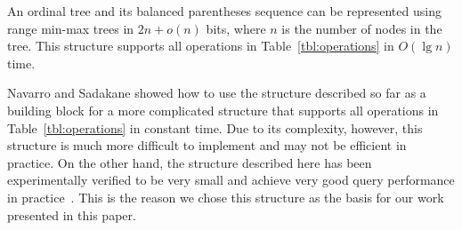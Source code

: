 \begin{lemma}\label{lem:lg}
  An ordinal tree and its balanced parentheses sequence can be represented using
  range min-max trees in $2n + o(n)$ bits, where $n$ is the number of nodes in
  the tree.
  This structure supports all operations in Table~\ref{tbl:operations} in
  $O(\lg n)$ time.
\end{lemma}

Navarro and Sadakane showed how to use the structure described so far as a
building block for a more complicated structure that supports all operations in
Table~\ref{tbl:operations} in constant time.
Due to its complexity, however, this structure is much more difficult to
implement and may not be efficient in practice.
On the other hand, the structure described here has been experimentally verified
to be very small and achieve very good query performance in
practice~\cite{ACNSalenex10}.
This is the reason we chose this structure as the basis for our work presented
in this paper.